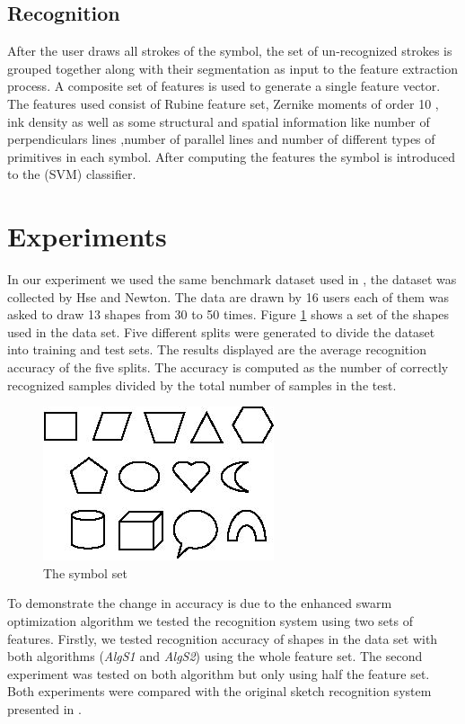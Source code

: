 \documentclass[10pt]{article}
\begin{document}
\subsection{Recognition}
\label{sec:Recognition}
After the user draws all strokes of the symbol, the set of un-recognized strokes is grouped together along with their segmentation as input to the feature extraction process. A composite set of features is used to generate a single feature vector. The features used consist of Rubine feature set,  Zernike moments of order 10 \cite{HeloiseBeautification}, ink density as well as some structural and spatial information like number of perpendiculars lines ,number of parallel lines and number of different types of primitives in each symbol. After computing the features the symbol is introduced to the (SVM) classifier. 

\cite{mypaper}  
\section{Experiments} 
\label{sec:Experiments}
In our experiment we used the same benchmark dataset used in \cite{mypaper}, the dataset was collected by Hse and Newton\cite{HeloiseBeautification}. The data are drawn by 16 users each of them was asked to draw 13 shapes from 30 to 50 times. Figure \ref{fig:symbolSet} shows a set of the shapes used in the data set. Five different splits were generated to divide the dataset into training and test sets. The results displayed are the average recognition accuracy of the five splits. The accuracy is computed as the number of correctly recognized samples divided by the total number of samples in the test.
	 
 \begin{figure}
  \centering 
 
		\includegraphics[scale=0.5]{symbolSet.PNG} 
		\caption[The Symbol Set] {The symbol set}   \label{fig:symbolSet}
	 \end{figure}
	
To demonstrate the change in accuracy is due to the enhanced swarm optimization algorithm we tested the recognition system using two sets of features. Firstly, we tested recognition accuracy of shapes in the data set with both algorithms (\textsl{AlgS1} and \textsl{AlgS2}) using the whole feature set. The second experiment was tested on both algorithm but only using half the feature set. Both experiments were compared with the original sketch recognition system presented in \cite{mypaper}. 
\end{document}
